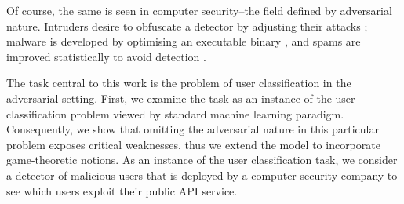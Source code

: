 Of course, the same is seen in computer security–the field defined by
adversarial nature. Intruders desire to obfuscate a detector by
adjusting their attacks \cite{adversarial_malware}; malware is developed by
optimising an executable binary \cite{adversarial_malware_pe}, and spams are improved
statistically to avoid detection \cite{good_word_attacks}.

The task central to this work is the problem of user classification in
the adversarial setting. First, we examine the task as an instance of
the user classification problem viewed by standard machine learning
paradigm. Consequently, we show that omitting the adversarial nature in
this particular problem exposes critical weaknesses, thus we extend the
model to incorporate game-theoretic notions. As an instance of the user
classification task, we consider a detector of malicious users that is
deployed by a computer security company to see which users exploit their
public API service.
